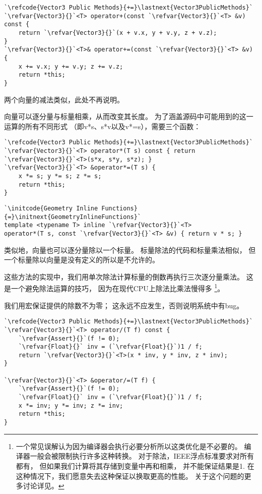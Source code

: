 \begin{lstlisting}
`\refcode{Vector3 Public Methods}{+=}\lastnext{Vector3PublicMethods}`
`\refvar{Vector3}{}`<T> operator+(const `\refvar{Vector3}{}`<T> &v) const {
    return `\refvar{Vector3}{}`(x + v.x, y + v.y, z + v.z);
}
`\refvar{Vector3}{}`<T>& operator+=(const `\refvar{Vector3}{}`<T> &v) {
    x += v.x; y += v.y; z += v.z;
    return *this;
}
\end{lstlisting}

两个向量的减法类似，此处不再说明。

向量可以逐分量与标量相乘，从而改变其长度。
为了涵盖源码中可能用到的这一运算的所有不同形式
（即{\ttfamily v*s}、{\ttfamily s*v}以及{\ttfamily v*=s}），需要三个函数：
\begin{lstlisting}
`\refcode{Vector3 Public Methods}{+=}\lastnext{Vector3PublicMethods}`
`\refvar{Vector3}{}`<T> operator*(T s) const { return `\refvar{Vector3}{}`<T>(s*x, s*y, s*z); }
`\refvar{Vector3}{}`<T> &operator*=(T s) {
    x *= s; y *= s; z *= s;
    return *this;
}
\end{lstlisting}
\begin{lstlisting}
`\initcode{Geometry Inline Functions}{=}\initnext{GeometryInlineFunctions}`
template <typename T> inline `\refvar{Vector3}{}`<T>
operator*(T s, const `\refvar{Vector3}{}`<T> &v) { return v * s; }
\end{lstlisting}

类似地，向量也可以逐分量除以一个标量。
标量除法的代码和标量乘法相似，
但一个标量除以向量是没有定义的所以是不允许的。

这些方法的实现中，我们用单次除法计算标量的倒数再执行三次逐分量乘法。
这是一个避免除法运算的技巧，
因为在现代CPU上除法比乘法慢得多
\footnote{一个常见误解认为因为编译器会执行必要分析所以这类优化是不必要的。
    编译器一般会被限制执行许多这种转换。
    对于除法，IEEE浮点标准要求对所有都有，
    但如果我们计算将其存储到变量中再和相乘，
    并不能保证结果是1.
    在这种情况下，我们愿意失去这种保证以换取更高的性能。
    关于这个问题的更多讨论详见\protect{}。}。

我们用宏保证提供的除数不为零；
这永远不应发生，否则说明系统中有bug。
\begin{lstlisting}
`\refcode{Vector3 Public Methods}{+=}\lastnext{Vector3PublicMethods}`
`\refvar{Vector3}{}`<T> operator/(T f) const {
    `\refvar{Assert}{}`(f != 0);
    `\refvar{Float}{}` inv = (`\refvar{Float}{}`)1 / f;
    return `\refvar{Vector3}{}`<T>(x * inv, y * inv, z * inv);
}

`\refvar{Vector3}{}`<T> &operator/=(T f) {
    `\refvar{Assert}{}`(f != 0);
    `\refvar{Float}{}` inv = (`\refvar{Float}{}`)1 / f;
    x *= inv; y *= inv; z *= inv;
    return *this;
}
\end{lstlisting}

